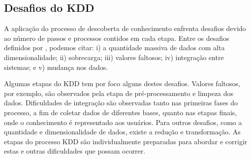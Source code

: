 \subsection{Desafios do KDD}
\label{subsec:kdd-desafios}

A aplicação do processo de descoberta de conhecimento enfrenta desafios devido ao número de passos e processos contidos em cada etapa. Entre os desafios definidos por , podemos citar: i) a quantidade massiva de dados com alta dimensionalidade; ii) sobrecarga; iii) valores faltosos; iv) integração entre sistemas; e v) mudança nos dados.

Algumas etapas do KDD tem por foco alguns destes desafios. Valores faltosos, por exemplo, são observados pela etapa de pré\hyp{}processamento e limpeza dos dados. Dificuldades de integração são observadas tanto nas primeiras fases do processo, a fim de coletar dados de diferentes bases, quanto nas etapas finais, onde o conhecimento é representado aos usuários. Para outros desafios, como a quantidade e dimensionalidade de dados, existe a redução e transformação. As etapas do processo KDD são individualmente preparadas para abordar e corrigir estas e outras dificuldades que possam ocorrer.
